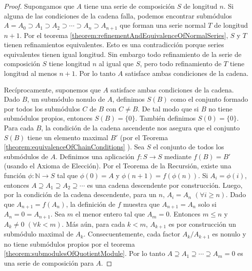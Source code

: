 \documentclass{report}
\newcommand{\naturalNumbers}{\mathbb{N}}
\begin{document}
  \begin{proof}
    Supongamos que \(A\) tiene una serie de composición \(S\) de longitud \(n\).
    Si alguna de las condiciones de la cadena falla, podemos encontrar submódulos \(A = A_0 \supset A_1 \supset A_2 \supset \cdots \supset A_n \supset A_{n + 1}\)
    que forman una serie normal \(T\) de longitud \(n + 1\).
    Por el teorema \ref{theorem:refinementAndEquivalenceOfNormalSeries}, \(S\) y \(T\) tienen refinamientos equivalentes.
    Esto es una contradicción porque series equivalentes tienen igual longitud.
    Sin embargo todo refinamiento de la serie de composición \(S\) tiene longitud \(n\) al igual que \(S\), pero todo refinamiento de \(T\) tiene longitud al menos \(n + 1\).
    Por lo tanto \(A\) satisface ambas condiciones de la cadena.

    Recíprocamente, suponemos que \(A\) satisface ambas condiciones de la cadena.
    Dado \(B\), un submódulo nonulo de \(A\), definimos \(S(B)\) como el conjunto formado por todos los submódulos \(C\) de \(B\) con \(C \neq B\).
    De tal modo que si \(B\) no tiene submódulos propios, entonces \(S(B) = \{0\}\).
    También definimos \(S(0) = \{0\}\).
    Para cada \(B\), la condición de la cadena ascendente nos asegura que el conjunto \(S(B)\) tiene un elemento maximal \(B'\) (por el Teorema \ref{theorem:equivalenceOfChainConditions}
    ).
    Sea \(S\) el conjunto de todos los submódulos de \(A\).
    Definimos una aplicación \(f : S \rightarrow S\) mediante \(f(B) = B'\) (usando el Axioma de Elección).
    Por el Teorema de la Recursión, existe una función \(\phi : \naturalNumbers \rightarrow S\) tal que \(\phi(0) = A\) y \(\phi(n + 1) = f(\phi(n))\).
    Si \(A_i = \phi(i)\), entonces \(A \supseteq A_1 \supseteq A_2 \supseteq \cdots\) es una cadena descendente por construcción.
    Luego, por la condición de la cadena descendente, para un \(n\), \(A_i = A_n\) \((\forall i \geq n)\).
    Dado que \(A_{n + 1} = f(A_n)\), la definición de \(f\) muestra que \(A_{n + 1} = A_n\) solo si \(A_n = 0 = A_{n + 1}\).
    Sea \(m\) el menor entero tal que \(A_m = 0\).
    Entonces \(m \leq n\) y \(A_k \neq 0\) \((\forall k < m)\).
    Más aún, para cada \(k < m\), \(A_{k + 1}\) es por construcción un submódulo maximal de \(A_k\).
    Consecuentemente, cada factor \(A_k / A_{k + 1}\) es nonulo y no tiene submódulos propios por el teorema \ref{theorem:submodulesOfQuotientModule}.
    Por lo tanto \(A \supseteq A_1 \supseteq \cdots \supseteq A_m = 0\) es una serie de composición para \(A\).
  \end{proof}
\end{document}
